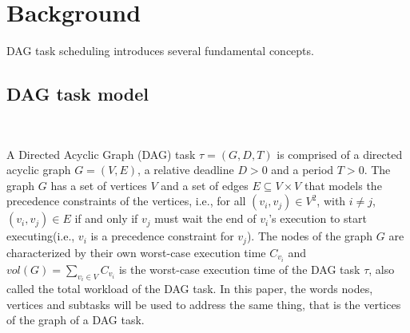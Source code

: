 
\section{Background}
\label{sec:bg}

DAG task scheduling introduces several fundamental concepts.

%
%

\subsection{DAG task model}
~

A Directed Acyclic Graph (DAG) task
$\tau = (G, D, T)$ is comprised of 
a directed acyclic graph $G = (V, E)$, a relative deadline $D > 0$ and a period $T > 0$.
The graph $G$ has a set of vertices $V$ and a set of edges $E \subseteq V \times V$
that models the precedence constraints of the vertices,
i.e., for all $(v_i, v_j) \in V^2$, with $i \neq j$, $(v_i, v_j) \in E$ if and only if
$v_j$ must wait the end of $v_i$'s execution to start executing(i.e., $v_i$ is a precedence constraint for $v_j$).
The nodes of the graph $G$ are characterized by their own worst-case execution time $C_{v_i}$ 
and $vol(G) = \sum_{v_i \in V} C_{v_i}$ is the worst-case execution time of the DAG task $\tau$,
also called the total workload of the DAG task.
In this paper, the words nodes, vertices and subtasks will be used
to address the same thing, that is the vertices of the graph of a DAG task.\\

